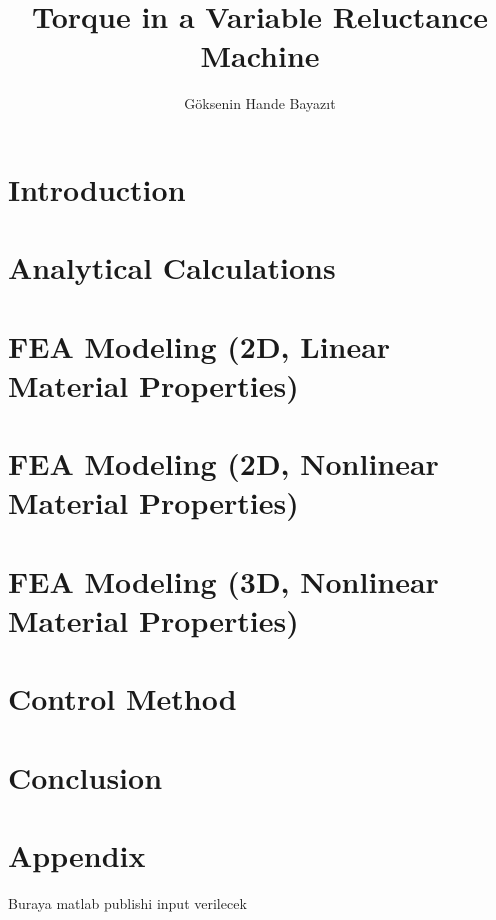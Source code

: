 \documentclass{reportClass}
\title{Torque in a Variable Reluctance Machine}
\author{G\"{o}ksenin Hande Bayazıt}
\begin{document}
\printtitle

\section{Introduction}

\section{Analytical Calculations}

\section{FEA Modeling (2D, Linear Material Properties)}

\section{FEA Modeling (2D, Nonlinear Material Properties)}

\section{FEA Modeling (3D, Nonlinear Material Properties)}

\section{Control Method}

\section{Conclusion}

\section*{Appendix}
Buraya matlab publishi input verilecek
\end{document}
